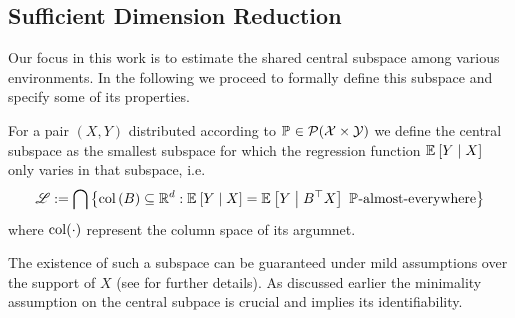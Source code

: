 \subsection{Sufficient Dimension Reduction}
Our focus in this work is to estimate the shared central subspace among various environments. 
In the following we proceed to formally define this subspace and specify some of its properties. 

\begin{definition}
    For a pair $(X,Y)$ distributed according to $\mathbb{P}^{} \in \mathcal{P}(\mathcal{X} \times \mathcal{Y})$ we define the central subspace as the smallest subspace for which the regression function $\mathbb{E}_{}\left[ Y \;\middle\vert\; X \right]$ only varies in that subspace, i.e.
    $$ \mathscr{L} := \bigcap \left\{ \operatorname{col}\left( B \right) \subseteq \mathbb{R}^{d} : \mathbb{E}_{}\left[ Y \;\middle\vert\; X \right] = \mathbb{E}_{}\left[ Y \;\middle\vert\; B^{\top} X \right] \,\, \mathbb{P}^{} \text{-almost-everywhere} \right\} $$
    where $\operatorname{col}(\cdot)$ represent the column space of its argumnet.
\end{definition}

The existence of such a subspace can be guaranteed under mild assumptions over the support of $X$ (see \citep{li2018sufficient} for further details). 
As discussed earlier the minimality assumption on the central subpace is crucial and implies its identifiability. 

